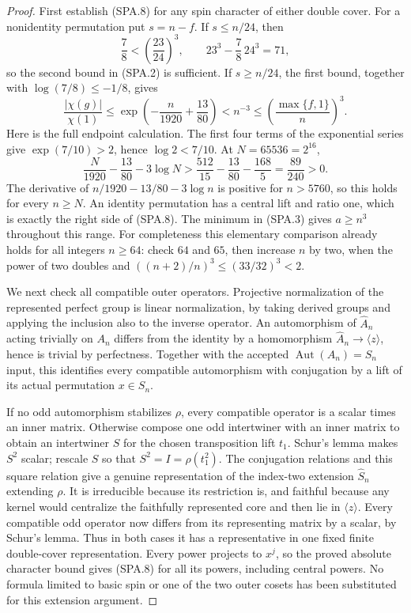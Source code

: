 \begin{proof}
First establish (SPA.8) for any spin character of either double
cover.  For a nonidentity permutation put $s=n-f$.  If $s\le n/24$,
then
\[
 \frac78<\left(\frac{23}{24}\right)^3,
 \qquad 23^3-\frac78\,24^3=71,
 \tag{SPA.10}
\]
so the second bound in (SPA.2) is sufficient.  If $s\ge n/24$,
the first bound, together with $\log(7/8)\le-1/8$, gives
\[
 \frac{|\chi(g)|}{\chi(1)}
 \le\exp\left(-\frac n{1920}+\frac{13}{80}\right)
 <n^{-3}\le\left(\frac{\max\{f,1\}}n\right)^3.
 \tag{SPA.11}
\]
Here is the full endpoint calculation.  The first four terms of
the exponential series give $\exp(7/10)>2$, hence $\log2<7/10$.
At $N=65536=2^{16}$,
\[
 \frac N{1920}-\frac{13}{80}-3\log N
 >\frac{512}{15}-\frac{13}{80}-\frac{168}{5}
 =\frac{89}{240}>0.
 \tag{SPA.12}
\]
The derivative of $n/1920-13/80-3\log n$ is positive for
$n>5760$, so this holds for every $n\ge N$.
An identity permutation has a central lift and ratio one,
which is exactly the right side of (SPA.8).
The minimum in (SPA.3) gives $a\ge n^3$ throughout this range.
For completeness this elementary comparison already holds for
all integers $n\ge64$: check $64$ and $65$, then increase $n$
by two, when the power of two doubles and
$((n+2)/n)^3\le(33/32)^3<2$.

We next check all compatible outer operators.  Projective
normalization of the represented perfect group is linear
normalization, by taking derived groups and applying the inclusion
also to the inverse operator.  An automorphism of $\widehat A_n$
acting trivially on $A_n$ differs from the identity by a homomorphism
$\widehat A_n\to\langle z\rangle$, hence is trivial by perfectness.
Together with the accepted $\operatorname{Aut}(A_n)=S_n$ input,
this identifies every compatible automorphism with conjugation
by a lift of its actual permutation $x\in S_n$.

If no odd automorphism stabilizes $\rho$, every compatible operator
is a scalar times an inner matrix.  Otherwise compose one odd
intertwiner with an inner matrix to obtain an intertwiner $S$ for
the chosen transposition lift $t_1$.  Schur's lemma makes $S^2$
scalar; rescale $S$ so that $S^2=I=\rho(t_1^2)$.  The conjugation
relations and this square relation give a genuine representation
of the index-two extension $\widehat S_n$ extending $\rho$.
It is irreducible because its restriction is, and faithful because
any kernel would centralize the faithfully represented core and
then lie in $\langle z\rangle$.
Every compatible odd operator now differs from its representing
matrix by a scalar, by Schur's lemma.  Thus in both cases it has
a representative in one fixed finite double-cover representation.
Every power projects to $x^j$, so the proved absolute character
bound gives (SPA.8) for all its powers, including central powers.
No formula limited to basic spin or one of the two outer cosets
has been substituted for this extension argument.


\end{proof}

